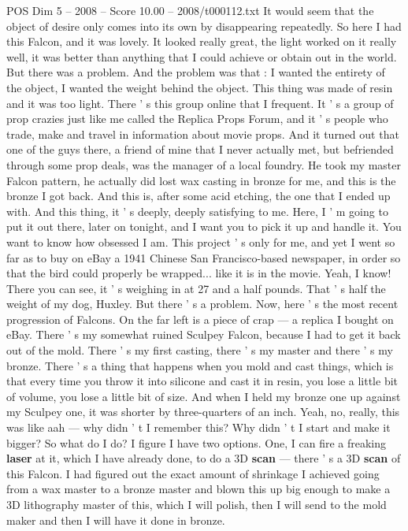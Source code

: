 \begin{textsample}{POS Dim 5 – 2008 – Score 10.00 – 2008/t000112.txt}
It would seem that the object of desire only comes into its own by disappearing repeatedly.
So here I had this Falcon, and it was lovely.
It looked really great, the light worked on it really well, it was better than anything that I could achieve or obtain out in the world.
But there was a problem.
And the problem was that : I wanted the entirety of the object, I wanted the weight behind the object.
This thing was made of resin and it was too light.
There ' s this group online that I frequent.
It ' s a group of prop crazies just like me called the Replica Props Forum, and it ' s people who trade, make and travel in information about movie props.
And it turned out that one of the guys there, a friend of mine that I never actually met, but befriended through some prop deals, was the manager of a local foundry.
He took my master Falcon pattern, he actually did lost wax casting in bronze for me, and this is the bronze I got back.
And this is, after some acid etching, the one that I ended up with.
And this thing, it ' s deeply, deeply satisfying to me.
Here, I ' m going to put it out there, later on tonight, and I want you to pick it up and handle it.
You want to know how obsessed I am.
This project ' s only for me, and yet I went so far as to buy on eBay a 1941 Chinese San Francisco-based newspaper, in order so that the bird could properly be wrapped... like it is in the movie.
Yeah, I know!
There you can see, it ' s weighing in at 27 and a half pounds.
That ' s half the weight of my dog, Huxley.
But there ' s a problem.
Now, here ' s the most recent progression of Falcons.
On the far left is a piece of crap — a replica I bought on eBay.
There ' s my somewhat ruined Sculpey Falcon, because I had to get it back out of the mold.
There ' s my first casting, there ' s my master and there ' s my bronze.
There ' s a thing that happens when you mold and cast things, which is that every time you throw it into silicone and cast it in resin, you lose a little bit of volume, you lose a little bit of size.
And when I held my bronze one up against my Sculpey one, it was shorter by three-quarters of an inch.
Yeah, no, really, this was like aah — why didn ' t I remember this?
Why didn ' t I start and make it bigger?
So what do I do?
I figure I have two options.
One, I can fire a freaking \textbf{laser} at it, which I have already done, to do a 3D \textbf{scan} — there ' s a 3D \textbf{scan} of this Falcon.
I had figured out the exact amount of shrinkage I achieved going from a wax master to a bronze master and blown this up big enough to make a 3D lithography master of this, which I will polish, then I will send to the mold maker and then I will have it done in bronze.

\end{textsample}
